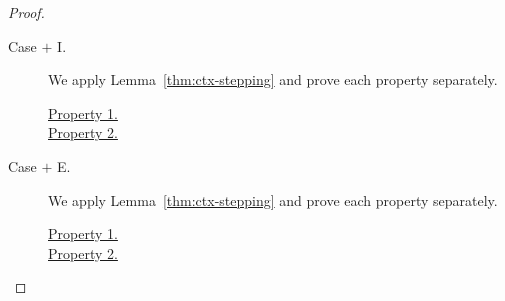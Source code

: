 \begin{proof}
\begin{description}
    \item[Case $+$ I.] 
      We apply Lemma~\ref{thm:ctx-stepping} and prove each property separately.
      \begin{description}
        \item[\underline{Property 1.}]
        \item[\underline{Property 2.}]
      \end{description}

    \item[Case $+$ E.] 
      We apply Lemma~\ref{thm:ctx-stepping} and prove each property separately.
      \begin{description}
        \item[\underline{Property 1.}]
        \item[\underline{Property 2.}]
      \end{description}

  \end{description}
\end{proof}

%
